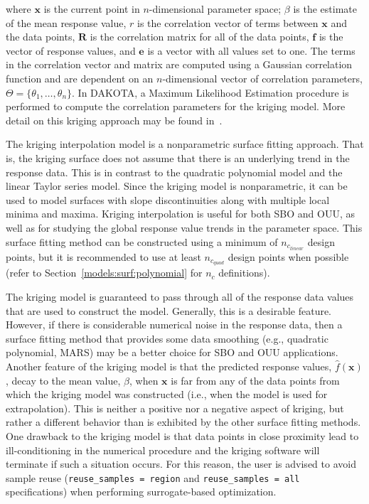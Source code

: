 where $\mathbf{x}$ is the current point in $n$-dimensional parameter
space; $\beta$ is the estimate of the mean response value, $r$ is the
correlation vector of terms between $\mathbf{x}$ and the data points,
$\mathbf{R}$ is the correlation matrix for all of the data points,
$\mathbf{f}$ is the vector of response values, and $\mathbf{e}$ is a
vector with all values set to one. The terms in the correlation vector
and matrix are computed using a Gaussian correlation function and are
dependent on an $n$-dimensional vector of correlation parameters,
$\Theta = \{\theta_{1},\ldots,\theta_{n}\}$.  In DAKOTA, a Maximum
Likelihood Estimation procedure is performed to compute the
correlation parameters for the kriging model. More detail on this
kriging approach may be found in~\cite{Giu98}.

The kriging interpolation model is a nonparametric surface fitting
approach. That is, the kriging surface does not assume that there is
an underlying trend in the response data. This is in contrast to the
quadratic polynomial model and the linear Taylor series model. Since
the kriging model is nonparametric, it can be used to model surfaces
with slope discontinuities along with multiple local minima and
maxima. Kriging interpolation is useful for both SBO and OUU, as well
as for studying the global response value trends in the parameter
space. This surface fitting method can be constructed using a minimum
of $n_{c_{linear}}$ design points, but it is recommended to use at
least $n_{c_{quad}}$ design points when possible (refer to
Section~\ref{models:surf:polynomial} for $n_{c}$ definitions).

The kriging model is guaranteed to pass through all of the response
data values that are used to construct the model. Generally, this is a
desirable feature. However, if there is considerable numerical noise
in the response data, then a surface fitting method that provides some
data smoothing (e.g., quadratic polynomial, MARS) may be a better
choice for SBO and OUU applications. Another feature of the kriging
model is that the predicted response values, $\hat{f}(\mathbf{x})$,
decay to the mean value, $\beta$, when $\mathbf{x}$ is far from any of
the data points from which the kriging model was constructed (i.e.,
when the model is used for extrapolation). This is neither a positive
nor a negative aspect of kriging, but rather a different behavior than
is exhibited by the other surface fitting methods. One drawback to the
kriging model is that data points in close proximity lead to
ill-conditioning in the numerical procedure and the kriging software
will terminate if such a situation occurs. For this reason, the user
is advised to avoid sample reuse (\texttt{reuse\_samples = region} and
\texttt{reuse\_samples = all} specifications) when performing
surrogate-based optimization.

